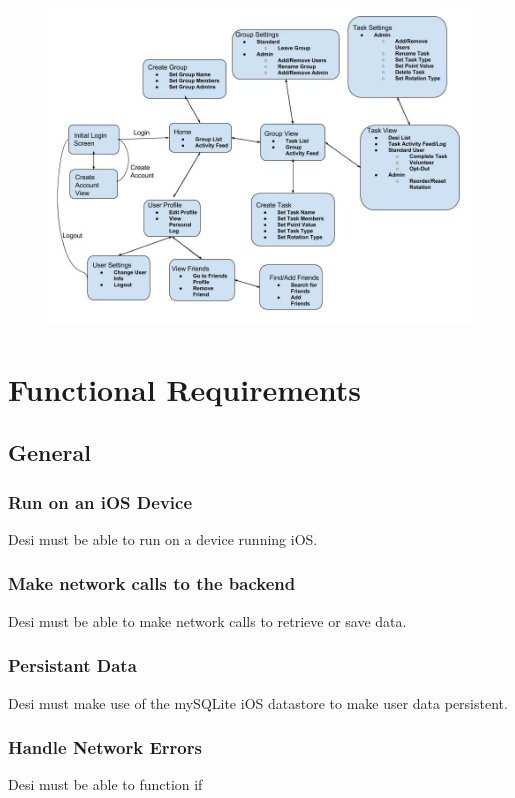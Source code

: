 \documentclass[11pt, a4paper]{report}
\begin{document}
\begin{figure}[H]
\centering
\includegraphics[width=1.0\textwidth]{umlHighLevel.jpg}
\end{figure}

\section{Functional Requirements}
\subsection{General}
\subsubsection{Run on an iOS Device}
Desi must be able to run on a device running iOS.
\subsubsection{Make network calls to the backend}
Desi must be able to make network calls to retrieve or save data.
\subsubsection{Persistant Data}
Desi must make use of the mySQLite iOS datastore to make user data persistent.
\subsubsection{Handle Network Errors}
Desi must be able to function if 
\end{document}
